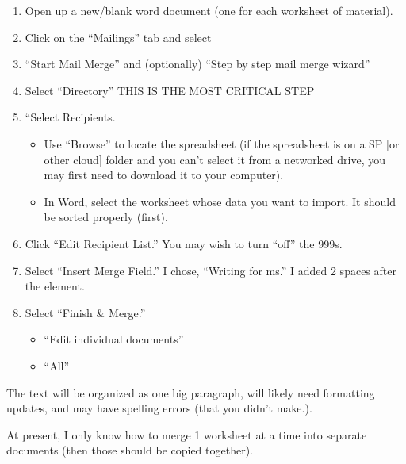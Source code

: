 \documentclass[
  english,
]{book}
\providecommand{\tightlist}{%
  \setlength{\itemsep}{0pt}\setlength{\parskip}{0pt}}
\begin{document}
\begin{enumerate}
\def\labelenumi{\arabic{enumi}.}
\tightlist
\item
  Open up a new/blank word document (one for each worksheet of material).
\item
  Click on the ``Mailings'' tab and select
\item
  ``Start Mail Merge'' and (optionally) ``Step by step mail merge wizard''
\item
  Select ``Directory'' THIS IS THE MOST CRITICAL STEP
\item
  ``Select Recipients.

  \begin{itemize}
  \tightlist
  \item
    Use ``Browse'' to locate the spreadsheet (if the spreadsheet is on a SP {[}or other cloud{]} folder and you can't select it from a networked drive, you may first need to download it to your computer).
  \item
    In Word, select the worksheet whose data you want to import. It should be sorted properly (first).
  \end{itemize}
\item
  Click ``Edit Recipient List.'' You may wish to turn ``off'' the 999s.
\item
  Select ``Insert Merge Field.'' I chose, ``Writing for ms.'' I added 2 spaces after the element.
\item
  Select ``Finish \& Merge.''

  \begin{itemize}
  \tightlist
  \item
    ``Edit individual documents''
  \item
    ``All''
  \end{itemize}
\end{enumerate}

The text will be organized as one big paragraph, will likely need formatting updates, and may have spelling errors (that you didn't make.).

At present, I only know how to merge 1 worksheet at a time into separate documents (then those should be copied together).
\end{document}
